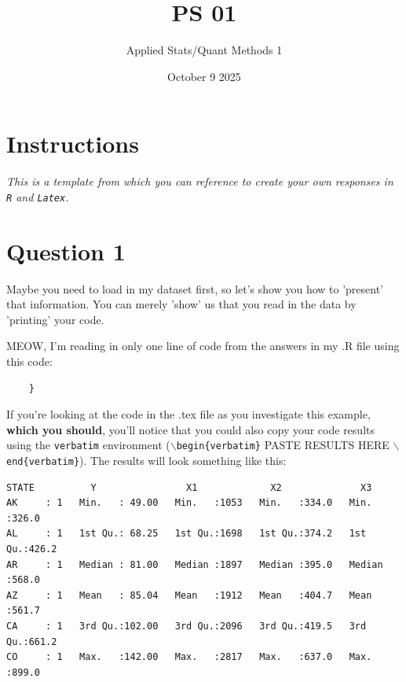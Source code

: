 \documentclass[12pt,letterpaper]{article}
\title{PS 01}
\date{October 9 2025}
\author{Applied Stats/Quant Methods 1}
\begin{document}
	\maketitle
	
	\section*{Instructions}

 \textit{This is a template from which you can reference to create your own responses in \texttt{R} and \texttt{Latex}.}

\section*{Question 1 }

\noindent Maybe you need to load in my dataset first, so let's show you how to 'present' that information. You can merely 'show' us that you read in the data by 'printing' your code. \\

  

\vspace{.25cm}

\noindent MEOW, I'm reading in only one line of code from the answers in my .R file using this code: 

\begin{verbatim}
	}
\end{verbatim}

\noindent If you're looking at the code in the .tex file as you investigate this example, \textbf{which you should}, you'll notice that you could also copy your code results using the \texttt{verbatim} environment (\texttt{$\backslash$begin\{verbatim\}} PASTE RESULTS HERE \texttt{$\backslash$end\{verbatim\}}). The results will look something like this:


\begin{verbatim}
STATE          Y                X1             X2              X3       
AK     : 1   Min.   : 49.00   Min.   :1053   Min.   :334.0   Min.   :326.0  
AL     : 1   1st Qu.: 68.25   1st Qu.:1698   1st Qu.:374.2   1st Qu.:426.2  
AR     : 1   Median : 81.00   Median :1897   Median :395.0   Median :568.0  
AZ     : 1   Mean   : 85.04   Mean   :1912   Mean   :404.7   Mean   :561.7  
CA     : 1   3rd Qu.:102.00   3rd Qu.:2096   3rd Qu.:419.5   3rd Qu.:661.2  
CO     : 1   Max.   :142.00   Max.   :2817   Max.   :637.0   Max.   :899.0  
\end{verbatim}
\vspace{.5cm}
\end{document}
